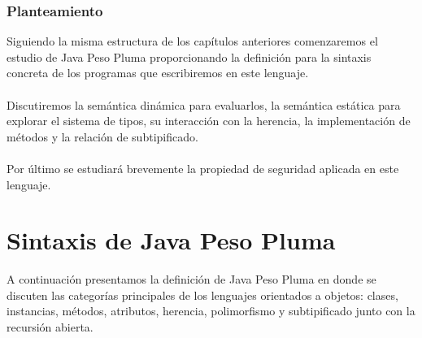 \subsubsection{Planteamiento}
Siguiendo la misma estructura de los capítulos anteriores comenzaremos el estudio de \textsf{Java Peso Pluma} proporcionando la definición para la sintaxis concreta de los programas que escribiremos en este lenguaje.\\\\
Discutiremos la semántica dinámica para evaluarlos, la semántica estática para explorar el sistema de tipos, su interacción con la herencia, la implementación de métodos y la relación de subtipificado.\\\\
Por último se estudiará brevemente la propiedad de seguridad aplicada en este lenguaje.

\section{Sintaxis de Java Peso Pluma}
A continuación presentamos la definición de \textsf{Java Peso Pluma} en donde se discuten las categorías principales de los lenguajes orientados a objetos: clases, instancias, métodos, atributos, herencia, polimorfismo y subtipificado junto con la recursión abierta.


